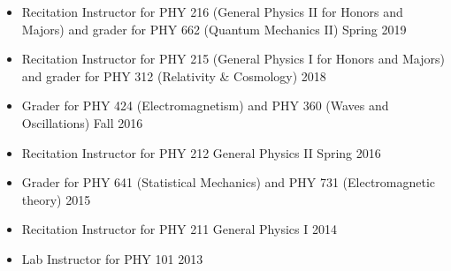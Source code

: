 
\begin{itemize}
 \item Recitation Instructor for PHY 216 (General Physics II for Honors and Majors) and grader for PHY 662 (Quantum Mechanics II)  \hfill Spring 2019 
 \item Recitation Instructor for PHY 215 (General Physics I for Honors and Majors) and grader for PHY 312 (Relativity \& Cosmology)   \hfill 2018 
 \item Grader for PHY 424 (Electromagnetism) and PHY 360 (Waves and Oscillations)  \hfill Fall 2016
 \item Recitation Instructor for PHY 212 General Physics II \hfill Spring 2016
 \item Grader for PHY 641 (Statistical Mechanics) and PHY 731 (Electromagnetic theory)  \hfill 2015 %
 \item Recitation Instructor for PHY 211 General Physics I \hfill 2014 %
 \item Lab Instructor for PHY 101  \hfill 2013
 \end{itemize}